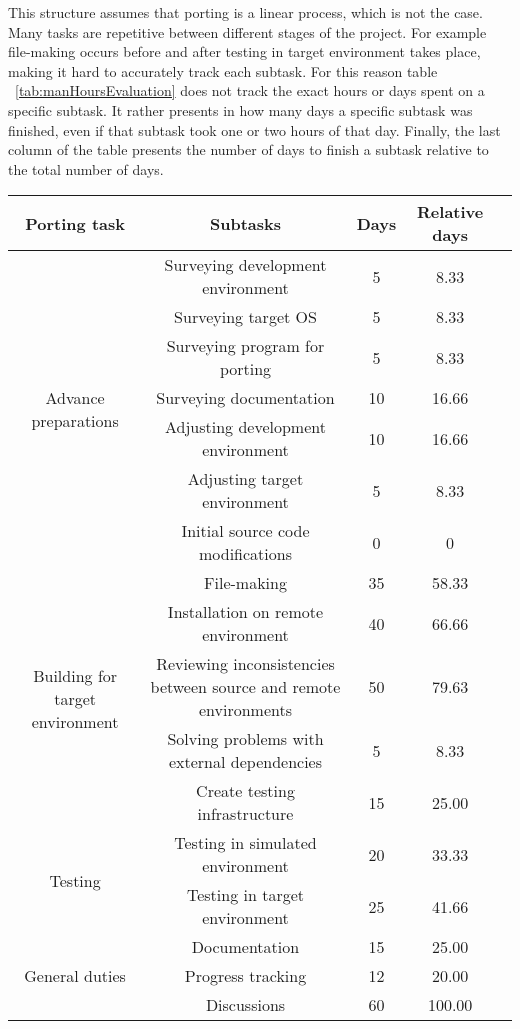This structure assumes that porting is a linear process, which is not the case.
Many tasks are repetitive between different stages of the project. For example
file-making occurs before and after testing in target environment takes place,
making it hard to accurately track each subtask. For this reason table
~\ref{tab:manHoursEvaluation} does not track the exact hours or days spent
on a specific subtask. It rather presents in how many days a specific subtask
was finished, even if that subtask took one or two hours of that day. Finally,
the last column of the table presents the number of days to finish a subtask
relative to the total number of days.

\begin{table*}
\centering
\begin{tabular}{ |c|c|c|c|c| }
\hline
Porting task & Subtasks & Days & Relative days \\
\hline
\multirow{7}{5em}{Advance preparations} & Surveying development environment & 5 & 8.33\\
& Surveying target OS & 5 & 8.33 \\
& Surveying program for porting & 5 & 8.33 \\
& Surveying documentation & 10 & 16.66 \\
& Adjusting development environment & 10 & 16.66 \\
& Adjusting target environment & 5 & 8.33 \\
& Initial source code modifications & 0 & 0 \\
\hline
\multirow{5}{5em}{Building for target environment} & File-making & 35  & 58.33\\
& Installation on remote environment & 40 & 66.66 \\
& Reviewing inconsistencies between source and remote environments & 50 & 79.63 \\
& Solving problems with external dependencies & 5 & 8.33 \\
& Create testing infrastructure & 15 & 25.00 \\
\hline
\multirow{2}{5em}{Testing} & Testing in simulated environment & 20  & 33.33\\
& Testing in target environment & 25 & 41.66 \\
\hline
\multirow{3}{5em}{General duties} & Documentation & 15  & 25.00 \\
& Progress tracking & 12 & 20.00 \\
& Discussions & 60 & 100.00 \\
\hline
\end{tabular}
\caption{Man-days evaluation for porting tasks}
\label{tab:manHoursEvaluation}
\end{table*}

